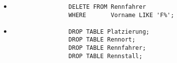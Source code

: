 \documentclass[ngerman]{gdb-aufgabenblatt}
\begin{document}
	\subsection{} %
		
		\begin{itemize}
			\item \begin{verbatim}
			    DELETE FROM Rennfahrer
			    WHERE       Vorname LIKE 'F%';
			\end{verbatim}	
			\item \begin{verbatim}
			    DROP TABLE Platzierung;
			    DROP TABLE Rennort;
			    DROP TABLE Rennfahrer;
			    DROP TABLE Rennstall;
			\end{verbatim}
		\end{itemize}
\end{document}
